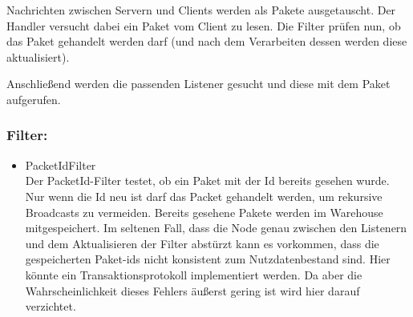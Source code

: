 Nachrichten zwischen Servern und Clients werden als Pakete ausgetauscht. Der Handler versucht dabei ein Paket vom Client zu lesen. Die Filter prüfen nun, ob das Paket gehandelt werden darf (und nach dem Verarbeiten dessen werden diese aktualisiert).

Anschließend werden die passenden Listener gesucht und diese mit dem Paket aufgerufen.




\subsubsection*{Filter:}
\begin{itemize}
    \item PacketIdFilter\\
        Der PacketId-Filter testet, ob ein Paket mit der Id bereits gesehen wurde. Nur wenn die Id neu ist darf das Packet gehandelt werden, um rekursive Broadcasts zu vermeiden. Bereits gesehene Pakete werden im Warehouse mitgespeichert. Im seltenen Fall, dass die Node genau zwischen den Listenern und dem Aktualisieren der Filter abstürzt kann es vorkommen, dass die gespeicherten Paket-ids nicht konsistent zum Nutzdatenbestand sind. Hier könnte ein Transaktionsprotokoll implementiert werden. Da aber die Wahrscheinlichkeit dieses Fehlers äußerst gering ist wird hier darauf verzichtet.
        
\end{itemize}



